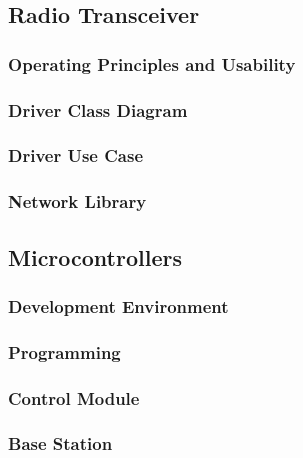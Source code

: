 
\subsection{Radio Transceiver}

\subsubsection{Operating Principles and Usability}

\subsubsection{Driver Class Diagram}

\subsubsection{Driver Use Case}

\subsubsection{Network Library}
\label{sec:network-library}

\subsection{Microcontrollers}


\subsubsection{Development Environment}

\subsubsection{Programming}

\subsubsection{Control Module}

\subsubsection{Base Station}

